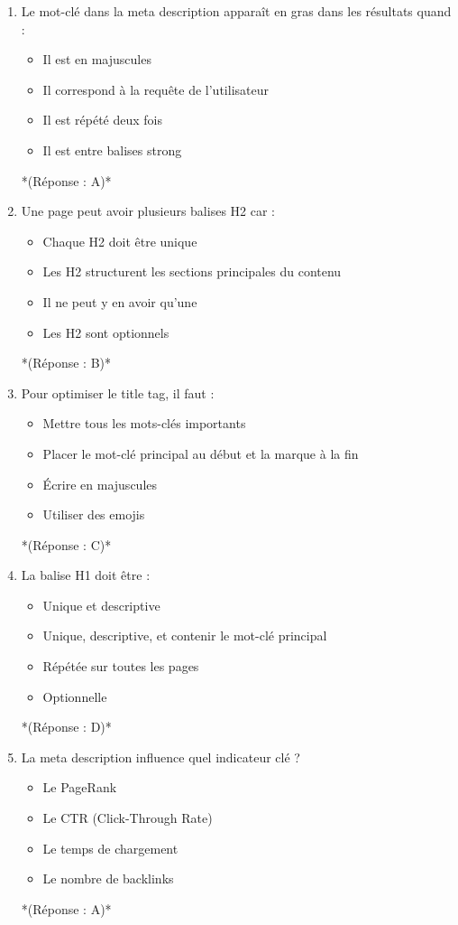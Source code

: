 \documentclass[12pt,a4paper,twoside]{report}
\begin{document}
\begin{enumerate}
\item Le mot-clé dans la meta description apparaît en gras dans les résultats quand :
\begin{itemize}
\item[A)] Il est en majuscules
\item[B)] Il correspond à la requête de l'utilisateur
\item[C)] Il est répété deux fois
\item[D)] Il est entre balises strong
\end{itemize}
*(Réponse : A)*

\item Une page peut avoir plusieurs balises H2 car :
\begin{itemize}
\item[A)] Chaque H2 doit être unique
\item[B)] Les H2 structurent les sections principales du contenu
\item[C)] Il ne peut y en avoir qu'une
\item[D)] Les H2 sont optionnels
\end{itemize}
*(Réponse : B)*

\item Pour optimiser le title tag, il faut :
\begin{itemize}
\item[A)] Mettre tous les mots-clés importants
\item[B)] Placer le mot-clé principal au début et la marque à la fin
\item[C)] Écrire en majuscules
\item[D)] Utiliser des emojis
\end{itemize}
*(Réponse : C)*

\item La balise H1 doit être :
\begin{itemize}
\item[A)] Unique et descriptive
\item[B)] Unique, descriptive, et contenir le mot-clé principal
\item[C)] Répétée sur toutes les pages
\item[D)] Optionnelle
\end{itemize}
*(Réponse : D)*

\item La meta description influence quel indicateur clé ?
\begin{itemize}
\item[A)] Le PageRank
\item[B)] Le CTR (Click-Through Rate)
\item[C)] Le temps de chargement
\item[D)] Le nombre de backlinks
\end{itemize}
*(Réponse : A)*


\end{enumerate}
\end{document}
